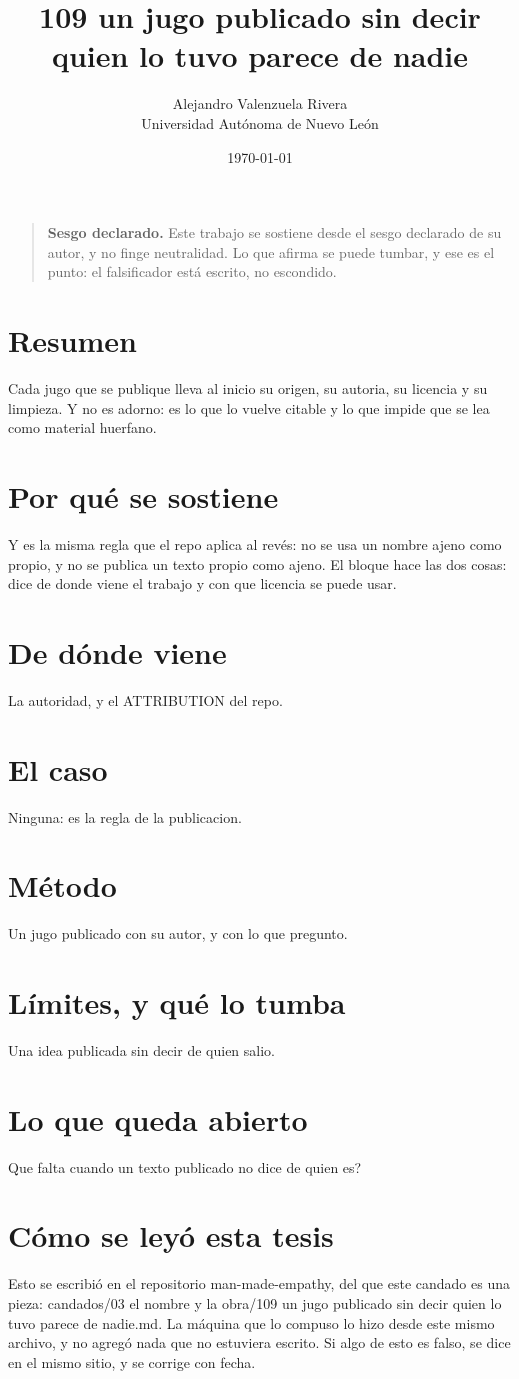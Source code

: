 \documentclass[11pt,a4paper]{article}
\title{109 un jugo publicado sin decir quien lo tuvo parece de nadie}
\author{Alejandro Valenzuela Rivera\\\small Universidad Autónoma de Nuevo León}
\date{\today}
\begin{document}
\maketitle

\begin{quote}
\textbf{Sesgo declarado.} Este trabajo se sostiene desde el sesgo declarado de su autor, y no finge neutralidad. Lo que afirma se puede tumbar, y ese es el punto: el falsificador está escrito, no escondido.
\end{quote}

\section*{Resumen}
Cada jugo que se publique lleva al inicio su origen, su autoria, su licencia y su limpieza. Y no es adorno: es lo que lo vuelve citable y lo que impide que se lea como material huerfano.

\section{Por qué se sostiene}
Y es la misma regla que el repo aplica al revés: no se usa un nombre ajeno como propio, y no se publica un texto propio como ajeno. El bloque hace las dos cosas: dice de donde viene el trabajo y con que licencia se puede usar.

\section{De dónde viene}
La autoridad, y el ATTRIBUTION del repo.

\section{El caso}
Ninguna: es la regla de la publicacion.

\section{Método}
Un jugo publicado con su autor, y con lo que pregunto.

\section{Límites, y qué lo tumba}
Una idea publicada sin decir de quien salio.

\section{Lo que queda abierto}
\textquestiondown{}Que falta cuando un texto publicado no dice de quien es?

\section*{Cómo se leyó esta tesis}
Esto se escribió en el repositorio man-made-empathy, del que este candado es una pieza: candados/03 el nombre y la obra/109 un jugo publicado sin decir quien lo tuvo parece de nadie.md. La máquina que lo compuso lo hizo desde este mismo archivo, y no agregó nada que no estuviera escrito. Si algo de esto es falso, se dice en el mismo sitio, y se corrige con fecha.
\end{document}
